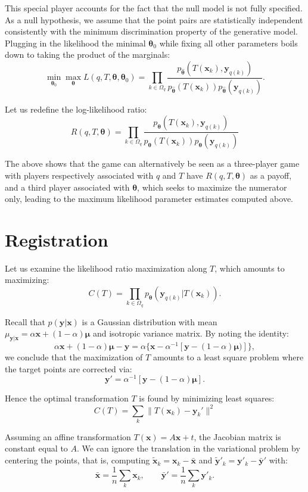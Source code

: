 \documentclass{article}
\def\x{{\mathbf{x}}}
\def\y{{\mathbf{y}}}
\def\m{{\boldsymbol{\mu}}}
\def\param{{\boldsymbol{\theta}}}
\begin{document}
This special player accounts for the fact that the null model is not fully specified. As a null hypothesis, we assume that the point pairs are statistically independent consistently with the minimum discrimination property of the generative model. Plugging in the likelihood the minimal $\param_0$ while fixing all other parameters boils down to taking the product of the marginals:
$$
\min_{\param_0}\max_\param
L(q,T,\param,\param_0) 
= 
\prod_{k\in\Omega_q} 
\frac{p_{\hat{\param}}(T(\x_k), \y_{q(k)})}{p_{\hat{\param}}(T(\x_k))p_{\hat{\param}}(\y_{q(k)})}
.
$$

Let us redefine the log-likelihood ratio:
$$
R(q,T,\param) = \prod_{k\in\Omega_q} 
\frac{p_{\param}(T(\x_k), \y_{q(k)})}{p_{\param}(T(\x_k))p_{\param}(\y_{q(k)})}
$$

The above shows that the game can alternatively be seen as a three-player game with players respectively associated with $q$ and $T$ have $R(q,T,\param)$ as a payoff, and a third player associated with $\param$, which seeks to maximize the numerator only, leading to the maximum likelihood parameter estimates computed above.


\section{Registration}

Let us examine the likelihood ratio maximization along $T$, which amounts to maximizing:
$$
C(T) = 
\prod_{k\in\Omega_q} 
p_{\param}(\y_{q(k)}|T(\x_k))
.
$$

Recall that $p(\y|\x)$ is a Gaussian distribution with mean $\mu_{\y|\x} = \alpha\x + (1-\alpha)\m$ and isotropic variance matrix. By noting the identity:
$$
\alpha \x + (1-\alpha) \m - \y 
= \alpha \{ \x - \alpha^{-1}[\y - (1-\alpha) \m)]\},
$$
we conclude that the maximization of $T$ amounts to a least square problem where the target points are corrected via:
$$
\y' = \alpha^{-1} [ \y - (1-\alpha) \m ]
.
$$

Hence the optimal transformation $T$ is found by minimizing least squares:
$$
C(T) = 
\sum_k
\|T(\x_k)-\y_k'\|^2
$$

Assuming an affine transformation $T(\x)=A\x + t$, the Jacobian matrix is constant equal to $A$. We can ignore the translation in the variational problem by centering the points, that is, computing $\tilde{\x}_k = \x_k - \bar{\x}$ and $\tilde{\y}'_k = \y'_k - \bar{\y}'$ with:
$$
\bar{\x} = \frac{1}{n} \sum_k \x_k,
\qquad
\bar{\y}' = \frac{1}{n} \sum_k \y'_k
.
$$
\end{document}
